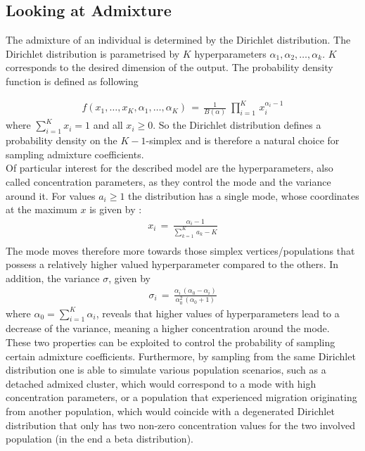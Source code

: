 \documentclass[a4paper, 11pt]{article}
\begin{document}
\subsection{Looking at Admixture}
The admixture of an individual is determined by the Dirichlet distribution. The Dirichlet distribution is parametrised by $K$ hyperparameters $\alpha_1,\alpha_2, \ldots, \alpha_k$. $K$ corresponds to the desired dimension of the output. The probability density function is defined as following

\begin{align*}
f(x_1, \ldots, x_K, \alpha_1, \ldots, \alpha_K)\, =\, \frac{1}{B(\alpha)}\; \prod^{K}_{i=1}\,x_i^{\alpha_i-1}
\end{align*}
where $\sum^{K}_{i =1} x_i = 1$ and all $x_i \geq 0$. So the Dirichlet distribution defines a probability density on the $K-1$-simplex and is therefore a natural choice for sampling admixture coefficients. \\
Of particular interest for the described model are the hyperparameters, also called concentration parameters, as they control the mode and the variance around it. For values $a_i \geq 1$ the distribution has a single mode, whose coordinates at the maximum $x$ is given by \cite{bishop2006pattern}: 
\begin{align*}
x_i\, =\, \frac{\alpha_i - 1}{\sum^K_{k=1}\, a_k -K} \\
\end{align*}
The mode moves therefore more towards those simplex vertices/populations that possess a relatively higher valued hyperparameter compared to the others. In addition, the variance $\sigma$, given by 
\begin{align*}
\sigma_i\, =\, \frac{\alpha_i\,(\alpha_0 - \alpha_i)}{\alpha_0^2\,(\alpha_0 + 1)}
\end{align*} 
where $\alpha_0 = \sum^{K}_{i = 1} \alpha_i$, reveals that higher values of hyperparameters lead to a decrease of the variance, meaning a higher concentration around the mode. \\
These two properties can be exploited to control the probability of sampling certain admixture coefficients. Furthermore, by sampling from the same Dirichlet distribution one is able to simulate various population scenarios, such as a detached admixed cluster, which would correspond to a mode with high concentration parameters, or a population that experienced migration originating from another population, which would coincide with a degenerated Dirichlet distribution that only has two non-zero concentration values for the two involved population (in the end a beta distribution).
\end{document}
